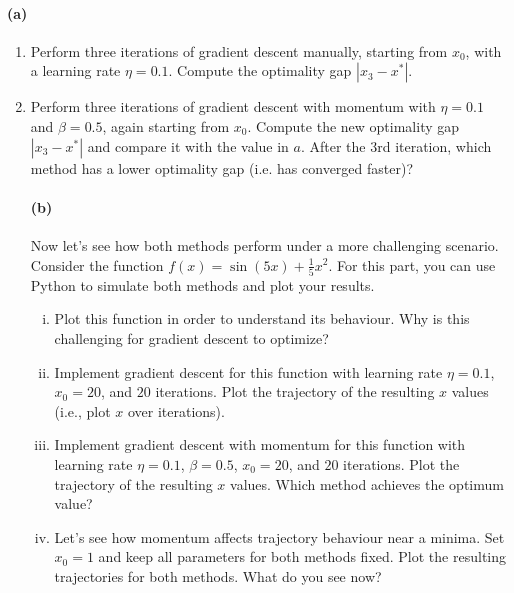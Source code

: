 \documentclass{exam}
\begin{document}
\paragraph{(a)}
\begin{enumerate}[i]
\item Perform three iterations of gradient descent manually, starting from $x_0$, with a learning rate $\eta = 0.1$. Compute the optimality gap $|x_3 - x^*|$.

\item Perform three iterations of gradient descent with momentum with $\eta = 0.1$ and $\beta = 0.5$, again starting from $x_0$. Compute the new optimality gap $|x_3 - x^*|$ and compare it with the value in $a$. After the $3$rd iteration, which method has a lower optimality gap (i.e. has converged faster)?

\paragraph{(b)}
Now let's see how both methods perform under a more challenging scenario. Consider the function $f(x) = \sin(5x) + \frac{1}{5}x^2$. For this part, you can use Python to simulate both methods and plot your results.
\begin{enumerate}[i.]
    \item Plot this function in order to understand its behaviour. Why is this challenging for gradient descent to optimize? 
   
    \item Implement gradient descent for this function with learning rate $\eta = 0.1$, $x_0 = 20$, and $20$ iterations. Plot the trajectory of the resulting $x$ values (i.e., plot $x$ over iterations).
    \item Implement gradient descent with momentum for this function with learning rate $\eta = 0.1$, $\beta = 0.5$, $x_0 = 20$, and $20$ iterations. Plot the trajectory of the resulting $x$ values. Which method achieves the optimum value?
   
    \item Let's see how momentum affects trajectory behaviour near a minima. Set $x_0 = 1$ and keep all parameters for both methods fixed. Plot the resulting trajectories for both methods. What do you see now?
    
\end{enumerate}


\end{enumerate}
\end{document}
